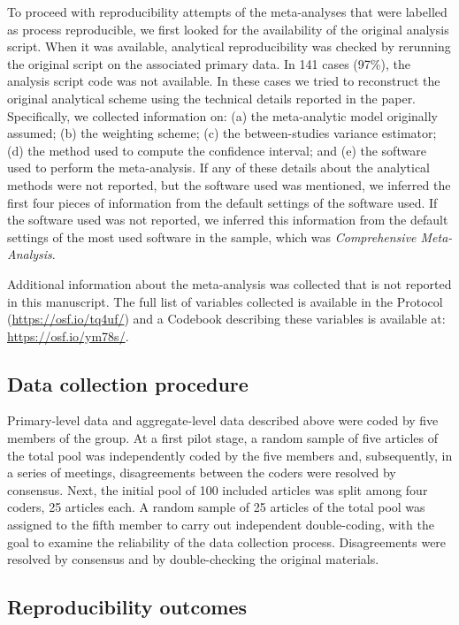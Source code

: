 \documentclass[
  ,apa7,floatsintext]{apa6}
\begin{document}
To proceed with reproducibility attempts of the meta-analyses that were labelled as process reproducible, we first looked for the availability of the original analysis script. When it was available, analytical reproducibility was checked by rerunning the original script on the associated primary data. In 141 cases (97\%), the analysis script code was not available. In these cases we tried to reconstruct the original analytical scheme using the technical details reported in the paper. Specifically, we collected information on: (a) the meta-analytic model originally assumed; (b) the weighting scheme; (c) the between-studies variance estimator; (d) the method used to compute the confidence interval; and (e) the software used to perform the meta-analysis. If any of these details about the analytical methods were not reported, but the software used was mentioned, we inferred the first four pieces of information from the default settings of the software used. If the software used was not reported, we inferred this information from the default settings of the most used software in the sample, which was \emph{Comprehensive Meta-Analysis}.

Additional information about the meta-analysis was collected that is not reported in this manuscript. The full list of variables collected is available in the Protocol (\url{https://osf.io/tq4uf/}) and a Codebook describing these variables is available at: \url{https://osf.io/ym78s/}.

\hypertarget{data-collection-procedure}{%
\subsection{Data collection procedure}\label{data-collection-procedure}}

Primary-level data and aggregate-level data described above were coded by five members of the group. At a first pilot stage, a random sample of five articles of the total pool was independently coded by the five members and, subsequently, in a series of meetings, disagreements between the coders were resolved by consensus. Next, the initial pool of 100 included articles was split among four coders, 25 articles each. A random sample of 25 articles of the total pool was assigned to the fifth member to carry out independent double-coding, with the goal to examine the reliability of the data collection process. Disagreements were resolved by consensus and by double-checking the original materials.

\hypertarget{reproducibility-outcomes}{%
\subsection{Reproducibility outcomes}\label{reproducibility-outcomes}}
\end{document}
